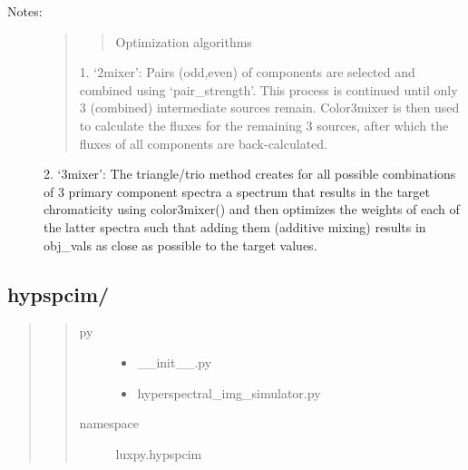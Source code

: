 \documentclass[letterpaper,10pt,english]{sphinxmanual}
\begin{document}
\begin{fulllineitems}
\begin{description}
\begin{quote}
\begin{description}
\end{description}\end{quote}

\item[{Notes:}] \leavevmode\begin{quote}
\begin{quote}\begin{description}
\item[{Optimization algorithms}] \leavevmode
\end{description}\end{quote}

1. ‘2mixer’:
Pairs (odd,even) of components are selected and combined using 
‘pair\_strength’. This process is continued until only 3 (combined)
intermediate sources remain. Color3mixer is then used to calculate 
the fluxes for the remaining 3 sources, after which the fluxes of 
all components are back-calculated.
\end{quote}

2. ‘3mixer’:
The triangle/trio method creates for all possible combinations of 
3 primary component spectra a spectrum that results in the target 
chromaticity using color3mixer() and then optimizes the weights of
each of the latter spectra such that adding them (additive mixing) 
results in obj\_vals as close as possible to the target values.

\end{description}

\end{fulllineitems}



\subsection{hypspcim/}
\label{\detokenize{toolboxes:hypspcim}}\begin{quote}
\begin{quote}\begin{description}
\item[{py}] \leavevmode\begin{itemize}
\item {} 
\_\_init\_\_.py

\item {} 
hyperspectral\_img\_simulator.py

\end{itemize}

\item[{namespace}] \leavevmode
luxpy.hypspcim

\end{description}\end{quote}
\end{quote}
\label{\detokenize{toolboxes:module-luxpy.toolboxes.hypspcim}}
\end{document}
